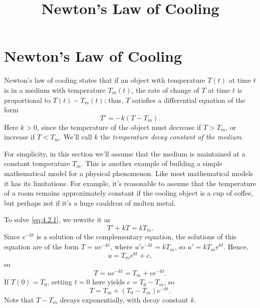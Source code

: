 \documentclass{ximera}
\title{Newton's Law of Cooling}
\begin{document}
\begin{abstract}

\end{abstract}

\maketitle



\section*{Newton's Law of Cooling}

Newton's law of cooling states that if an object with temperature
$T(t)$ at time $t$ is in a medium with temperature $T_m(t)$,  the
rate of change of $T$ at time $t$ is proportional to $T(t)-T_m(t)$;
thus,
$T$ satisfies a differential equation of the form
\begin{equation} \label{eq:4.2.1}
T'=-k(T-T_m).
\end{equation}
 Here $k > 0$, since the temperature of the object must decrease if
$T > T_m$, or increase if $T < T_m$.  We'll call $k$  the \textit{temperature decay constant of the medium}.

For simplicity, in this section we'll assume  that the medium is
maintained at a constant temperature $T_m$. This is another example of
 building a simple mathematical model for a physical
phenomenon. Like most mathematical models it has its limitations. For
example, it's reasonable to assume that the temperature of a room
remains approximately constant if the cooling object is a cup of
coffee, but perhaps not if it's a huge cauldron of molten metal. 


To solve  \eqref{eq:4.2.1}, we rewrite it as
$$
T'+kT=kT_m.
$$
Since $e^{-kt}$ is a solution of the complementary equation, the
solutions of this equation are of the form $T=ue^{-kt}$, where
$u'e^{-kt}=kT_m$, so $u'=kT_me^{kt}$. Hence,
$$
u=T_me^{kt}+c,
$$
so
$$
T=ue^{-kt}=T_m+ce^{-kt}.
$$
If $T(0)=T_0$,  setting $t=0$ here yields $c=T_0-T_m$, so
\begin{equation} \label{eq:4.2.2}
T=T_m+(T_0-T_m)e^{-kt}.
\end{equation}
Note that $T-T_m$ decays exponentially, with decay constant $k$.
\end{document}
